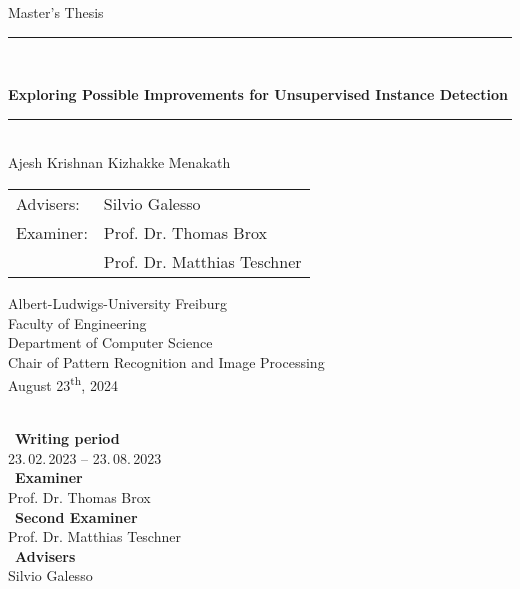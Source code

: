 
\begin{titlepage}
\begin{center}

\newcommand{\HorizontalLine}{\rule{\linewidth}{0.3mm}}

{\Large Master's Thesis}\\[1.3cm]


\HorizontalLine \\[0.4cm]
\begin{spacing}{2
}
    {\huge \bfseries Exploring Possible
    	Improvements for Unsupervised Instance Detection} \\
\end{spacing}
\HorizontalLine \\[1.5cm]


{\Huge Ajesh Krishnan Kizhakke Menakath} \\[2cm]


\begin{tabular}[hc]{>{\huge}l >{\huge}l}
  
  Advisers: & Silvio Galesso \\[1.2cm]
  Examiner: & Prof. Dr. Thomas Brox \\[0.2cm]
    &          Prof. Dr. Matthias Teschner \\[0.3cm]
\end{tabular}
\vfill  %

\Large {
    Albert-Ludwigs-University Freiburg\\
    Faculty of Engineering\\
    Department of Computer Science\\
    Chair of Pattern Recognition and Image Processing\\[1cm]

    August 23\textsuperscript{th}, 2024\\
}
\end{center}
\end{titlepage}

\ \vfill \ \\  %
\
\textbf{Writing period}            \smallskip{} \\
23.\,02.\,2023 -- 23.\,08.\,2023   \bigskip{} \\
\
\textbf{Examiner}                  \smallskip{} \\
Prof. Dr. Thomas Brox              \bigskip{} \\
\
\textbf{Second Examiner}                  \smallskip{} \\
Prof. Dr. Matthias Teschner           \bigskip{} \\
\
\textbf{Advisers}                  \smallskip{} \\
Silvio Galesso
